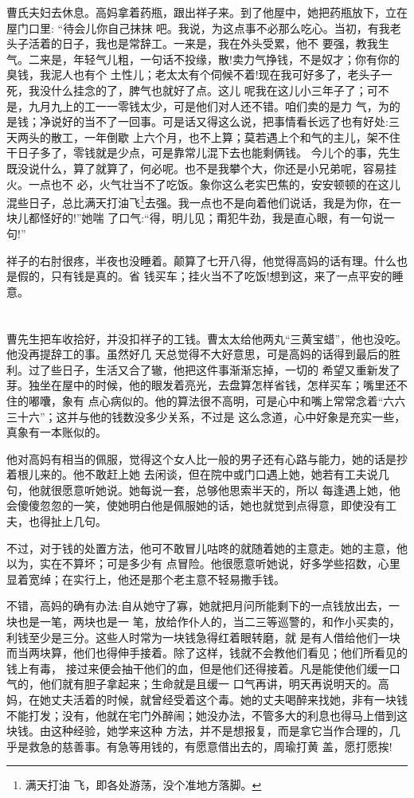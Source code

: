 \documentclass[11pt,a4paper,onecolumn]{article}
\begin{document}
曹氏夫妇去休息。高妈拿着药瓶，跟出祥子来。到了他屋中，她把药瓶放下，立在屋门口里: ``待会儿你自己抹抹
吧。我说，为这点事不必那么吃心。当初，有我老头子活着的日子，我也是常辞工。一来是，我在外头受累，他不
要强，教我生气。二来是，年轻气儿粗，一句话不投缘，散!卖力气挣钱，不是奴才；你有你的臭钱，我泥人也有个
土性儿；老太太有个伺候不着!现在我可好多了，老头子一死，我没什么挂念的了，脾气也就好了点。这儿
呢\myrule 我在这儿小三年子了；可不是，九月九上的工一一零钱太少，可是他们对人还不错。咱们卖的是力
气，为的是钱；净说好的当不了一回事。可是话又得这么说，把事情看长远了也有好处:三天两头的散工，一年倒歇
上六个月，也不上算；莫若遇上个和气的主儿，架不住干日子多了，零钱就是少点，可是靠常儿混下去也能剩俩钱。
今儿个的事，先生既没说什么，算了就算了，何必呢。也不是我攀个大，你还是小兄弟呢，容易挂火。一点也不
必，火气壮当不了吃饭。象你这么老实巴焦的，安安顿顿的在这儿混些日子，总比满天打油飞\footnote{满天打油
  飞，即各处游荡，没个准地方落脚。}去强。我一点也不是向着他们说话，我是为你，在一块儿都怪好的!''她喘
了口气:``得，明儿见；甭犯牛劲，我是直心眼，有一句说一句!''

祥子的右肘很疼，半夜也没睡着。颠算了七开八得，他觉得高妈的话有理。什么也是假的，只有钱是真的。省
钱买车；挂火当不了吃饭!想到这，来了一点平安的睡意。

\pagebreak
\section{}

曹先生把车收拾好，并没扣祥子的工钱。曹太太给他两丸``三黄宝蜡''，他也没吃。他没再提辞工的事。虽然好几
天总觉得不大好意思，可是高妈的话得到最后的胜利。过了些日子，生活又合了辙，他把这件事渐渐忘掉，一切的
希望又重新发了芽。独坐在屋中的时候，他的眼发着亮光，去盘算怎样省钱，怎样买车；嘴里还不住的嘟囔，象有
点心病似的。他的算法很不高明，可是心中和嘴上常常念着``六六三十六''；这并与他的钱数没多少关系，不过是
这么念道，心中好象是充实一些，真象有一本账似的。

他对高妈有相当的佩服，觉得这个女人比一般的男子还有心路与能力，她的话是抄着根儿来的。他不敢赶上她
去闲谈，但在院中或门口遇上她，她若有工夫说几句，他就很愿意听她说。她每说一套，总够他思索半天的，所以
每逢遇上她，他会傻傻忽忽的一笑，使她明白他是佩服她的话，她也就觉到点得意，即使没有工夫，也得扯上几句。

不过，对于钱的处置方法，他可不敢冒儿咕咚的就随着她的主意走。她的主意，他以为，实在不算坏；可是多少有
点冒险。他很愿意听她说，好多学些招数，心里显着宽绰；在实行上，他还是那个老主意\myrule 不轻易撒手钱。

不错，高妈的确有办法:自从她守了寡，她就把月问所能剩下的一点钱放出去，一块也是一笔，两块也是一
笔，放给作仆人的，当二三等巡警的，和作小买卖的，利钱至少是三分。这些人时常为一块钱急得红着眼转磨，就
是有人借给他们一块而当两块算，他们也得伸手接着。除了这样，钱就不会教他们看见；他们所看见的钱上有毒，
接过来便会抽干他们的血，但是他们还得接着。凡是能使他们缓一口气的，他们就有胆子拿起来；生命就是且缓一
口气再讲，明天再说明天的。高妈，在她丈夫活着的时候，就曾经受着这个毒。她的丈夫喝醉来找她，非有一块钱
不能打发；没有，他就在宅门外醉闹；她没办法，不管多大的利息也得马上借到这块钱。由这种经验，她学来这种
方法，并不是想报复，而是拿它当作合理的，几乎是救急的慈善事。有急等用钱的，有愿意借出去的，周瑜打黄
盖，愿打愿挨!
\end{document}
